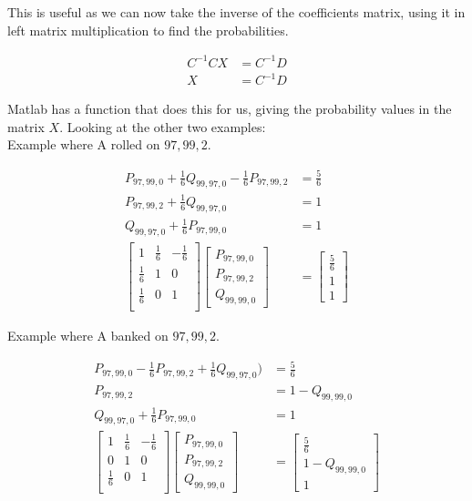\documentclass[a4paper,titlepage]{article}
\begin{document}
This is useful as we can now take the inverse of the coefficients matrix, using it in left matrix multiplication to find the probabilities.

\begin{align*}
	C^{-1}CX &= C^{-1}D\\
	X        &= C^{-1}D
\end{align*}

Matlab has a function that does this for us, giving the probability values in the matrix $X$. Looking at the other two examples:\\
Example where A rolled on $97,99,2$.

\begin{align*}
	P_{97,99,0} + \frac{1}{6}Q_{99,97,0} - \frac{1}{6}P_{97,99,2} &= \frac{5}{6}\\
	P_{97,99,2} + \frac{1}{6}Q_{99,97,0}                          &=  1\\
	Q_{99,97,0} + \frac{1}{6}P_{97,99,0}                          &= 1\\
	\begin{bmatrix}
		1           & \frac{1}{6} & -\frac{1}{6}\\
		\frac{1}{6} & 1           & 0\\
		\frac{1}{6} & 0           & 1\\
	\end{bmatrix}
	\begin{bmatrix}
		P_{97,99,0}\\
		P_{97,99,2}\\
		Q_{99,99,0}
	\end{bmatrix}
	& =
	\begin{bmatrix}
		\frac{5}{6}\\
		1\\
		1
	\end{bmatrix}
\end{align*}

Example where A banked on $97,99,2$.

\begin{align*}
	P_{97,99,0} - \frac{1}{6}P_{97,99,2} + \frac{1}{6}Q_{99,97,0}) &= \frac{5}{6}\\
	P_{97,99,2}                                                    &= 1 - Q_{99,99,0}\\
	Q_{99,97,0} + \frac{1}{6}P_{97,99,0}                           &= 1\\
	\begin{bmatrix}
		1           & \frac{1}{6} & -\frac{1}{6}\\
		0           & 1           & 0\\
		\frac{1}{6} & 0           & 1\\
	\end{bmatrix}
	\begin{bmatrix}
		P_{97,99,0}\\
		P_{97,99,2}\\
		Q_{99,99,0}
	\end{bmatrix}
	& =
	\begin{bmatrix}
		\frac{5}{6}\\
		1 - Q_{99,99,0}\\
		1
	\end{bmatrix}
\end{align*}
\end{document}
